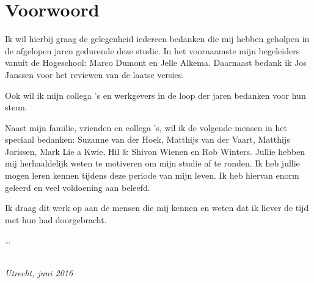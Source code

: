 \chapter*{Voorwoord}

Ik wil hierbij graag de gelegenheid iedereen bedanken die mij hebben geholpen in de afgelopen jaren gedurende deze studie. In het voornaamste mijn begeleiders vanuit de Hogeschool: Marco Dumont en Jelle Alkema.\newline
Daarnaast bedank ik Jos Janssen voor het reviewen van de laatse versies.\newline

Ook wil ik mijn collega 's en werkgevers in de loop der jaren bedanken voor hun steun.\newline

Naast mijn familie, vrienden en collega 's, wil ik de volgende mensen in het speciaal bedanken: \newline
Suzanne van der Hoek, Matthijs van der Vaart, Matthijs Jorissen, Mark Lie a Kwie, Hil \& Shivon Wienen en Rob Winters.\newline
Jullie hebben mij herhaaldelijk weten te motiveren om mijn studie af te ronden. Ik heb jullie mogen leren kennen tijdens deze periode van mijn leven. Ik heb hiervan enorm geleerd en veel voldoening aan beleefd.\newline 

Ik draag dit werk op aan de mensen die mij kennen en weten dat ik liever de tijd met hun had doorgebracht.

\ldots

\begin{flushright}
{\makeatletter\itshape
    \@author \\
    Utrecht, juni 2016
\makeatother}
\end{flushright}

